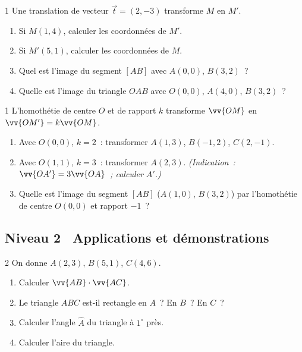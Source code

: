 \begin{exo}{1}
Une translation de vecteur $\vec{t}=(2,-3)$ transforme $M$ en $M'$.
\begin{enumerate}
  \item Si $M(1,4)$, calculer les coordonn\'ees de $M'$.
  \item Si $M'(5,1)$, calculer les coordonn\'ees de $M$.
  \item Quel est l'image du segment $[AB]$ avec $A(0,0)$, $B(3,2)$~?
  \item Quelle est l'image du triangle $OAB$ avec $O(0,0)$, $A(4,0)$, $B(3,2)$~?
\end{enumerate}
\end{exo}

\begin{exo}{1}
L'homoth\'etie de centre $O$ et de rapport $k$ transforme $\vv{OM}$
en $\vv{OM'} = k\vv{OM}$.
\begin{enumerate}
  \item Avec $O(0,0)$, $k=2$~: transformer $A(1,3)$, $B(-1,2)$, $C(2,-1)$.
  \item Avec $O(1,1)$, $k=3$~: transformer $A(2,3)$.
        \emph{(Indication~: $\vv{OA'} = 3\vv{OA}$~; calculer $A'$.)}
  \item Quelle est l'image du segment $[AB]$ ($A(1,0)$, $B(3,2)$) par
        l'homoth\'etie de centre $O(0,0)$ et rapport $-1$~?
\end{enumerate}
\end{exo}

\subsection*{\quad Niveau 2 \textemdash\ Applications et d\'emonstrations}

\begin{exo}{2}
On donne $A(2,3)$, $B(5,1)$, $C(4,6)$.
\begin{enumerate}
  \item Calculer $\vv{AB}\cdot\vv{AC}$.
  \item Le triangle $ABC$ est-il rectangle en $A$~? En $B$~? En $C$~?
  \item Calculer l'angle $\hat{A}$ du triangle \`a $1^{\circ}$ pr\`es.
  \item Calculer l'aire du triangle.
\end{enumerate}
\end{exo}

